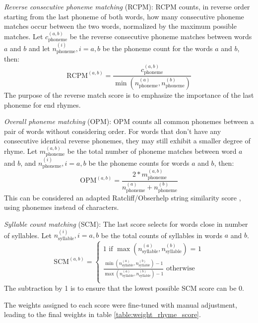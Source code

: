 \documentclass[11pt,a4paper]{article}
\newenvironment{tight_itemize}{
\begin{itemize}
\setlength{\itemsep}{0pt}
\setlength{\parskip}{0pt}
}{\end{itemize}}
\begin{document}
\begin{tight_itemize}
	\vspace{-0.5em}
	\item \textit{Reverse consecutive phoneme matching} (RCPM):
	RCPM counts, in reverse order starting from the last phoneme of both words, how many consecutive phoneme matches occur between the two words, normalized by the maximum possible matches. Let $c^{(a,b)}_{\text{phoneme}}$ be the reverse consecutive phoneme matches between words $a$ and $b$ and let $n^{(i)}_{\text{phoneme}}, i = {a, b}$ be the phoneme count for the words $a$ and $b$, then:
	$$\textrm{RCPM}^{(a,b)} = \frac{c^{(a,b)}_{\text{phoneme}}}{\min(n^{(a)}_{\text{phoneme}}, n^{(b)}_{\text{phoneme}})}$$
	The purpose of the reverse match score is to emphasize the importance of the last phoneme for end rhymes.
	\item \textit{Overall phoneme matching} (OPM):
		OPM counts all common phonemes between a pair of words without considering order. For words that don't have any consecutive identical reverse phonemes, they may still exhibit a smaller degree of rhyme. Let $m^{(a,b)}_{\text{phoneme}}$ be the total number of phoneme matches between word $a$ and $b$, and $n^{(i)}_{\text{phoneme}}, i = {a, b}$ be the phoneme counts for words $a$ and $b$, then:
		$$\textrm{OPM}^{(a,b)} = \frac{2 * m^{(a,b)}_{\text{phoneme}}}{n^{(a)}_{\text{phoneme}} + n^{(b)}_{\text{phoneme}}}$$
		This can be considered an adapted Ratcliff/Obserhelp string similarity score \cite{ratcliff}, using phonemes instead of characters.
	\item \textit{Syllable count matching} (SCM):
	The last score selects for words close in number of syllables. Let $n^{(i)}_{\text{syllable}}, i = {a, b}$ be the total counts of syllables in words $a$ and $b$.
	\begin{equation}
	\textrm{SCM}^{(a,b)} = 
	\begin{cases}
	\nonumber 1 \text{ if $\max(n^{(a)}_{\text{syllable}}, n^{(b)}_{\text{syllable}})$ = 1}\\
	\nonumber \frac{\min(n^{(a)}_{\text{syllable}}, n^{(b)}_{\text{syllable}}) - 1}{\max(n^{(a)}_{\text{syllable}}, n^{(b)}_{\text{syllable}}) - 1} \text{ otherwise}\\
        \end{cases}
	\end{equation}
	The subtraction by 1 is to ensure that the lowest possible SCM score can be 0.
\end{tight_itemize}

The weights assigned to each score were fine-tuned with manual adjustment, leading to the final weights in table \ref{table:weight_rhyme_score}.
\end{document}
